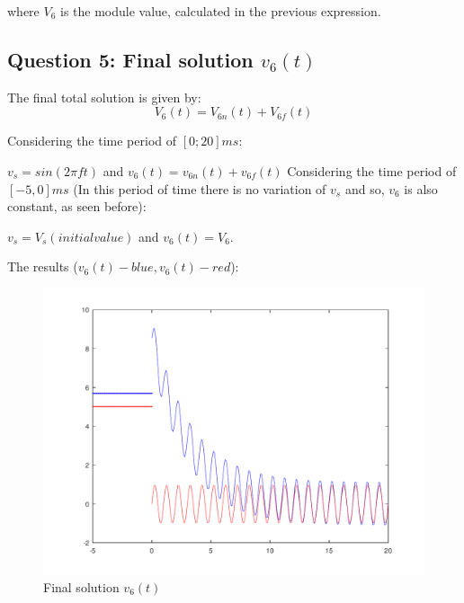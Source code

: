 where $V_6$ is the module value, calculated in the previous expression.



\subsection{Question 5: Final solution $v_{6}(t)$ }
The final total solution is given by:
\begin{equation}
     V_6(t) = V_{6n}(t) + V_{6f}(t)
\end{equation}\par
Considering the time period of $[0 ; 20]ms$: \par $v_s = sin(2\pi ft)$ and $v_6(t)= v_{6n}(t) + v_{6f}(t)$
Considering the time period of $[-5,0]ms$ (In this period of time there is no variation of $v_s$ and so, $v_6$ is also constant, as seen before):\par $v_s = V_s (initial value)$ and $v_6(t) =V_6$.\par
The results ($v_6(t) - blue, v_6 (t) - red$):
\begin{figure}[H] \centering
\includegraphics[width=0.7\linewidth]{../mat/alinea5.pdf}
\caption{Final solution $v_{6}(t)$}
\label{fig:plot5}
\end{figure}


